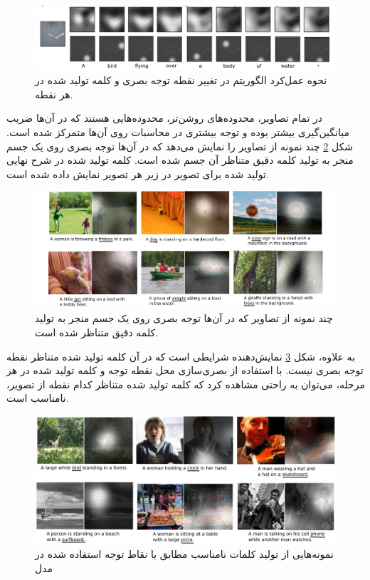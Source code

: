 \begin{figure}[h]
\centering
\includegraphics[scale=0.4]{Imgs/show1.png}
\caption{نحوه عمل‌کرد الگوریتم در تغییر نقطه توجه بصری و کلمه تولید شده در هر نقطه. \cite{xu2015show}}
\label{fig:show1}
\end{figure}  
  
  در تمام تصاویر، محدوده‌های روشن‌تر، محدوده‌هایی هستند که در آن‌ها ضریب میانگین‌گیری بیشتر بوده و توجه بیشتری در محاسبات روی آن‌ها متمرکز شده است. شکل \ref{fig:show2} چند نمونه از تصاویر را نمایش می‌دهد که در آن‌ها توجه بصری روی یک جسم منجر به تولید کلمه دقیق متناظر آن جسم شده است. کلمه تولید شده در شرح نهایی تولید شده برای تصویر در زیر هر تصویر نمایش داده شده است.

\begin{figure}[h]
\centering
\includegraphics[scale=0.5]{Imgs/show2.png}
\caption{چند نمونه از تصاویر که در آن‌ها توجه بصری روی یک جسم منجر به تولید کلمه دقیق متناظر شده است\cite{xu2015show}. }
\label{fig:show2}
\end{figure}

  به علاوه، شکل \ref{fig:show3} نمایش‌دهنده شرایطی است که در آن کلمه تولید شده متناظر نقطه توجه بصری نیست. با استفاده از بصری‌سازی محل نقطه توجه و کلمه تولید شده در هر مرحله، می‌توان به راحتی مشاهده کرد که کلمه تولید شده متناظر کدام نقطه از تصویر،‌ نامناسب است.
  
  \begin{figure}[h]
  \centering
  \includegraphics[scale=0.4]{Imgs/show3.png}
  \caption{نمونه‌هایی از تولید کلمات نامناسب مطابق با نقاط توجه استفاده شده در مدل‌\cite{xu2015show}}
  \label{fig:show3}
  \end{figure}
    
